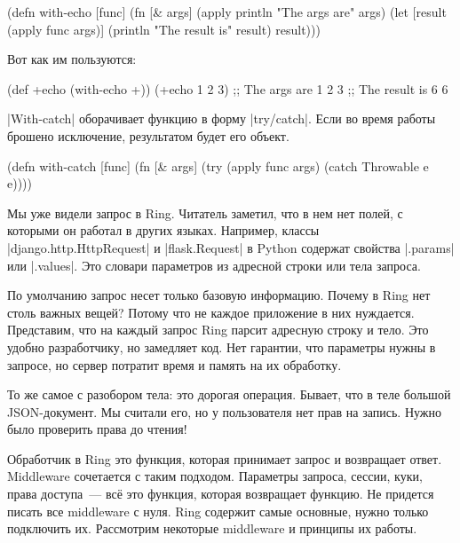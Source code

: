 \begin{english}
  \begin{clojure}
(defn with-echo [func]
  (fn [& args]
    (apply println "The args are" args)
    (let [result (apply func args)]
      (println "The result is" result)
      result)))
  \end{clojure}
\end{english}

Вот как им пользуются:

\begin{english}
  \begin{clojure}
(def +echo (with-echo +))
(+echo 1 2 3)
;; The args are 1 2 3
;; The result is 6
6
  \end{clojure}
\end{english}

\spverb|With-catch| оборачивает функцию в форму \spverb|try/catch|. Если во
время работы брошено исключение, результатом будет его объект.

\begin{english}
  \begin{clojure}
(defn with-catch [func]
  (fn [& args]
    (try
      (apply func args)
      (catch Throwable e
        e))))
  \end{clojure}
\end{english}

Мы уже видели запрос в Ring. Читатель заметил, что в нем нет полей, с которыми
он работал в других языках. Например, классы \spverb|django.http.HttpRequest| и
\spverb|flask.Request| в Python содержат свойства \spverb|.params| или
\spverb|.values|. Это словари параметров из адресной строки или тела запроса.

По умолчанию запрос несет только базовую информацию. Почему в Ring нет столь
важных вещей? Потому что не каждое приложение в них нуждается. Представим, что
на каждый запрос Ring парсит адресную строку и тело. Это удобно разработчику, но
замедляет код. Нет гарантии, что параметры нужны в запросе, но сервер потратит
время и память на их обработку.

То же самое с разобором тела: это дорогая операция. Бывает, что в теле большой
JSON-документ. Мы считали его, но у пользователя нет прав на запись. Нужно было
проверить права до чтения!

Обработчик в Ring это функция, которая принимает запрос и возвращает
ответ. Middleware сочетается с таким подходом. Параметры запроса, сессии, куки,
права доступа~--- вс\"{е} это функция, которая возвращает функцию. Не придется
писать все middleware с нуля. Ring содержит самые основные, нужно только
подключить их. Рассмотрим некоторые middleware и принципы их работы.


